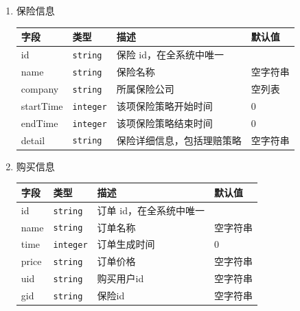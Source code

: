 \documentclass[a4paper]{ctexart}
\begin{document}
\begin{enumerate}[label=DR\arabic*.]
  \item 保险信息
        \begin{center}
          \begin{tabular}{llll}
            \toprule
            字段           & 类型              & 描述                       & 默认值   \\
            \midrule
            id             & \texttt{string}   & 保险 id，在全系统中唯一    &          \\
            name           & \texttt{string}   & 保险名称                   & 空字符串 \\
            company        & \texttt{string}   & 所属保险公司               & 空列表   \\
            startTime      & \texttt{integer}  & 该项保险策略开始时间       & 0        \\
            endTime        & \texttt{integer}  & 该项保险策略结束时间       & 0        \\
            detail         & \texttt{string}   & 保险详细信息，包括理赔策略 & 空字符串 \\
            \bottomrule
          \end{tabular}
        \end{center}
        
  \item 购买信息
    \begin{center}
      \begin{tabular}{llll}
        \toprule
        字段           & 类型              & 描述                       & 默认值   \\
        \midrule
        id             & \texttt{string}   & 订单 id，在全系统中唯一    &          \\
        name           & \texttt{string}   & 订单名称                   & 空字符串 \\
        time           & \texttt{integer}  & 订单生成时间               & 0        \\
        price          & \texttt{string}   & 订单价格                   & 空字符串 \\
        uid            & \texttt{string}   & 购买用户id                 & 空字符串 \\
        gid            & \texttt{string}   & 保险id                     & 空字符串 \\
        \bottomrule
      \end{tabular}
        \end{center}
        

\end{enumerate}
\end{document}
